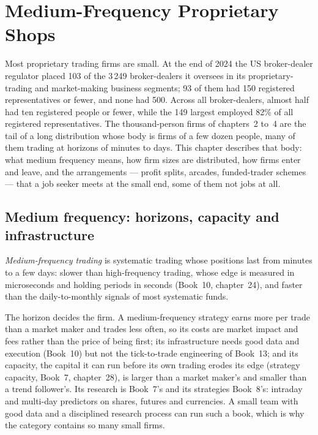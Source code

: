 \chapter{Medium-Frequency Proprietary Shops}\label{ch:in:medium-frequency-proprietary-shops}

Most proprietary trading firms are small. At the end of 2024 the US broker-dealer regulator placed 103 of the 3\,249
broker-dealers it oversees in its proprietary-trading and market-making business segments; 93 of them had 150
registered representatives or fewer, and none had 500. Across all broker-dealers, almost half had ten registered people
or fewer, while the 149 largest employed 82\% of all registered representatives. The thousand-person firms of
chapters~2 to~4 are the tail of a long distribution whose body is firms of a few dozen people, many of them trading at
horizons of minutes to days. This chapter describes that body: what medium frequency means, how firm sizes are
distributed, how firms enter and leave, and the arrangements --- profit splits, arcades, funded-trader schemes --- that
a job seeker meets at the small end, some of them not jobs at all.

\section{Medium frequency: horizons, capacity and infrastructure}

\begin{definition}\label{def:in:medium-frequency-proprietary-shops:mft}
\emph{Medium-frequency trading} is systematic trading whose positions last from minutes to
a few days: slower than high-frequency trading, whose edge is measured in microseconds and holding periods in seconds
(Book~10, chapter~24), and faster than the daily-to-monthly signals of most systematic funds.
\end{definition}

The horizon decides the firm. A medium-frequency strategy earns more per trade than a market maker and trades less
often, so its costs are market impact and fees rather than the price of being first; its infrastructure needs good data
and execution (Book~10) but not the tick-to-trade engineering of Book~13; and its capacity, the capital it can run before
its own trading erodes its edge (strategy capacity, Book~7, chapter~28), is larger than a market maker's and smaller than
a trend follower's. Its research is Book~7's and its strategies Book~8's: intraday and multi-day predictors on shares,
futures and currencies. A small team with good data and a disciplined research process can run such a book, which is
why the category contains so many small firms.

